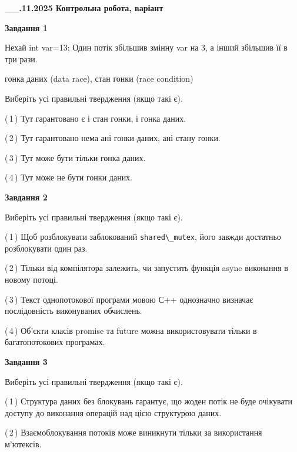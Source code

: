 \documentclass[12pt, ukrainian]{article}
\def\code#1{\Verb!#1!}
\begin{document}
\begin {large}

\textbf{\_\_.11.2025 Контрольна робота, варіант  }\par


{

\begin{center}
\textbf{Завдання 1}
\end{center}
Нехай int var=13; Один потік збільшив змінну var на 3, а інший збільшив її в три рази.

гонка даних (data race), стан гонки (race condition)

Виберіть усі правильні твердження (якщо такі є).\par
\vspace{2mm}
(\,1\,) Тут гарантовано є і стан гонки, і гонка даних.%

(\,2\,) Тут гарантовано нема ані гонки даних, ані стану гонки.%

(\,3\,) Тут може бути тільки гонка даних.%

(\,4\,) Тут може не бути гонки даних.%



\begin{center}
\textbf{Завдання 2}
\end{center}
Виберіть усі правильні твердження (якщо такі є).\par

(\,1\,) Щоб розблокувати заблокований \code{shared\_mutex}, його завжди достатньо розблокувати один раз.%

(\,2\,) Тільки від компілятора залежить, чи запустить функція async виконання в новому потоці.%

(\,3\,) Текст однопотокової програми мовою С++ однозначно визначає послідовність виконуваних обчислень.%

(\,4\,) Об’єкти класів promise та future можна використовувати тільки в багатопотокових програмах.%



\begin{center}
\textbf{Завдання 3}
\end{center}
Виберіть усі правильні твердження (якщо такі є).\par
\vspace{2mm}

(\,1\,) Структура даних без блокувань гарантує, що жоден потік не буде очікувати доступу до виконання операцій над цією структурою даних.%

(\,2\,) Взаємоблокування потоків може виникнути тільки за використання м’ютексів.%

}
\end{large}
\end{document}
